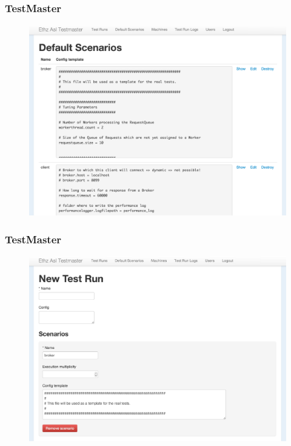 \documentclass{beamer}
\begin{document}

\begin{frame}
\frametitle{TestMaster}
\begin{figure}
  \begin{center}
    \includegraphics[scale=0.3]{../../drawings/TestMaster01.png}
  \end{center}
  \label{fig:testsystem}
\end{figure}
\end{frame}



\begin{frame}
\frametitle{TestMaster}
\begin{figure}
  \begin{center}
    \includegraphics[scale=0.3]{../../drawings/TestMaster02.png}
  \end{center}
  \label{fig:testsystem}
\end{figure}
\end{frame}
\end{document}
